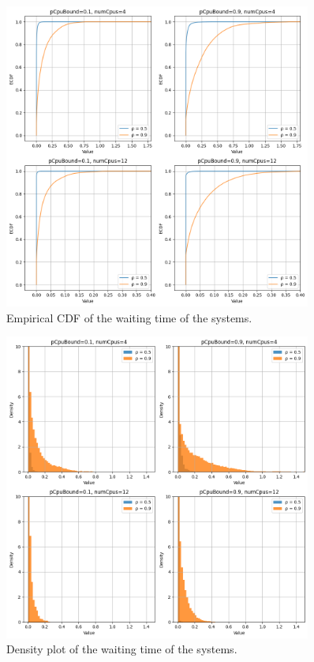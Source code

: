 \begin{figure}[H]
    \captionsetup{type=figure}
    \centering
    \includegraphics[width=0.9\textwidth]{./images/04/fcfs/wait/ecdf.png}
    \caption{Empirical CDF of the waiting time of the systems.}
    \label{fig:fcfsWaitEcdf}
\end{figure}

\begin{figure}[H]
    \captionsetup{type=figure}
    \centering
    \includegraphics[width=0.9\textwidth]{./images/04/fcfs/wait/density.png}
    \caption{Density plot of the waiting time of the systems.}
    \label{fig:fcfsWaitDensity}
\end{figure}

